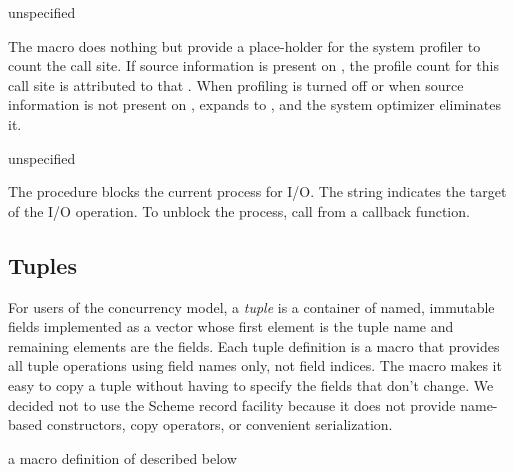 \begin{syntax}
\end{syntax}
\returns{} unspecified

The  macro does nothing but provide a
place-holder for the system profiler to count the call site.
If source information is present on , the profile count
for this call site is attributed to that .
When profiling is turned off or when source information is not
present on ,  expands to
, and the system optimizer eliminates it.

\begin{procedure}
\end{procedure}
\returns{} unspecified

The  procedure blocks the current process for
I/O. The  string indicates the target of the I/O
operation. To unblock the process, call  from a
callback function.

\subsection {Tuples}

For users of the concurrency model, a \emph{tuple} is a
container of named, immutable fields implemented as a vector whose
first element is the tuple name and remaining elements are the
fields. Each tuple definition is a macro that provides all tuple
operations using field names only, not field indices. The macro makes
it easy to copy a tuple without having to specify the fields that
don't change.  We decided not to use the Scheme record facility
because it does not provide name-based constructors, copy operators,
or convenient serialization.

\begin{syntax}
\end{syntax}
\expandsto{} a macro definition of  described below

